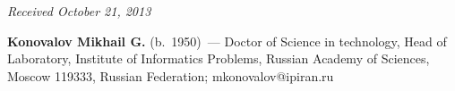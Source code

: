 \vspace*{-6pt}

\hfill{\small\textit{Received October 21, 2013}}

\vspace*{-18pt}

\Contr


\noindent
\textbf{Konovalov Mikhail G.} (b.\ 1950)~--- Doctor of Science in technology, Head of 
Laboratory, Institute of Informatics Problems, Russian Academy of Sciences,
Moscow 119333, Russian Federation;
mkonovalov@ipiran.ru

 \label{end\stat}
 
\renewcommand{\bibname}{\protect\rm Литература}